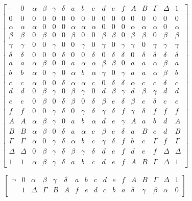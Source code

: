 \[\begin{bmatrix}
 \cdot & 0 & \alpha & \beta & \gamma & \delta & a & b & c & d & e & f & A & B & \Gamma & \Delta & 1 \\
0 & 0 & 0 & 0 & 0 & 0 & 0 & 0 & 0 & 0 & 0 & 0 & 0 & 0 & 0 & 0 & 0 \\
\alpha & \alpha & \alpha & 0 & 0 & 0 & \alpha & \alpha & \alpha & 0 & 0 & 0 & \alpha & \alpha & \alpha & 0 & \alpha \\
\beta & \beta & 0 & \beta & 0 & 0 & \beta & 0 & 0 & \beta & \beta & 0 & \beta & \beta & 0 & \beta & \beta \\
\gamma & \gamma & 0 & 0 & \gamma & 0 & 0 & \gamma & 0 & \gamma & 0 & \gamma & \gamma & 0 & \gamma & \gamma & \gamma \\
\delta & \delta & 0 & 0 & 0 & \delta & 0 & 0 & \delta & 0 & \delta & \delta & 0 & \delta & \delta & \delta & \delta \\
a & a & \alpha & \beta & 0 & 0 & a & \alpha & \alpha & \beta & \beta & 0 & a & a & \alpha & \beta & a \\
b & b & \alpha & 0 & \gamma & 0 & \alpha & b & \alpha & \gamma & 0 & \gamma & a & a & \alpha & \beta & b \\
c & c & \alpha & 0 & 0 & \delta & \alpha & \alpha & c & 0 & \delta & \delta & \alpha & c & c & \delta & c \\
d & d & 0 & \beta & \gamma & 0 & \beta & \gamma & 0 & d & \beta & \gamma & d & \beta & \gamma & d & d \\
e & e & 0 & \beta & 0 & \delta & \beta & 0 & \delta & \beta & e & \delta & \beta & e & \delta & e & e \\
f & f & 0 & 0 & \gamma & \delta & 0 & \gamma & \delta & \gamma & \delta & f & \gamma & \delta & f & f & f \\
A & A & \alpha & \beta & \gamma & 0 & a & b & \alpha & d & e & \gamma & A & a & b & d & A \\
B & B & \alpha & \beta & 0 & \delta & a & \alpha & c & \beta & e & \delta & a & B & c & d & B \\
\Gamma & \Gamma & \alpha & 0 & \gamma & \delta & \alpha & b & c & \gamma & \delta & f & b & c & \Gamma & f & \Gamma \\
\Delta & \Delta & 0 & \beta & \gamma & \delta & \beta & \gamma & \delta & d & e & f & d & e & f & \Delta & \Delta \\
1 & 1 & \alpha & \beta & \gamma & \delta & a & b & c & d & e & f & A & B & \Gamma & \Delta & 1
\end{bmatrix}\]

\[\begin{bmatrix}
\neg & 0 & \alpha & \beta & \gamma & \delta & a & b & c & d & e & f & A & B & \Gamma & \Delta & 1 \\
 & 1 & \Delta & \Gamma & B & A & f & e & d & c & b & a & \delta & \gamma & \beta & \alpha & 0
\end{bmatrix}\]

